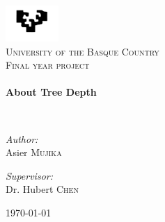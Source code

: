 \begin{titlepage}
\begin{center}

\includegraphics[width=0.15\textwidth]{./Title/logo}~\\[1cm]

\textsc{\LARGE University of the Basque Country}\\[1.5cm]

\textsc{\Large Final year project}\\[0.5cm]

\HRule \\[0.4cm]
{ \huge \bfseries About Tree Depth \\[0.4cm] }

\HRule \\[1.5cm]

\noindent
\begin{minipage}{0.4\textwidth}
\begin{flushleft} \large
\emph{Author:}\\
Asier \textsc{Mujika}
\end{flushleft}
\end{minipage}
\begin{minipage}{0.4\textwidth}
\begin{flushright} \large
\emph{Supervisor:} \\
Dr. Hubert \textsc{Chen}
\end{flushright}
\end{minipage}

\vfill

{\large \today}

\end{center}
\end{titlepage}
